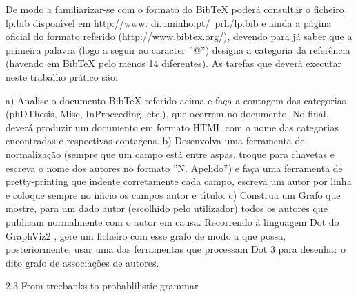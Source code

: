 De modo a familiarizar-se com o formato do BibTeX poderá consultar o ficheiro lp.bib disponı́vel em http://www.
di.uminho.pt/~prh/lp.bib e ainda a página oficial do formato referido (http://www.bibtex.org/), devendo para
já saber que a primeira palavra (logo a seguir ao caracter ”@”) designa a categoria da referência (havendo em BibTeX
pelo menos 14 diferentes).
As tarefas que deverá executar neste trabalho prático são:

a) Analise o documento BibTeX referido acima e faça a contagem das categorias (phDThesis, Misc, InProceeding,
    etc.), que ocorrem no documento. No final, deverá produzir um documento em formato HTML com o nome das
    categorias encontradas e respectivas contagens.
b) Desenvolva uma ferramenta de normalização (sempre que um campo está entre aspas, troque para chavetas e
    escreva o nome dos autores no formato ”N. Apelido”) e faça uma ferramenta de pretty-printing que indente
    corretamente cada campo, escreva um autor por linha e coloque sempre no inı́cio os campos autor e tı́tulo.
c) Construa um Grafo que mostre, para um dado autor (escolhido pelo utilizador) todos os autores que publicam
     normalmente com o autor em causa.
     Recorrendo à linguagem Dot do GraphViz2 , gere um ficheiro com esse grafo de modo a que possa, posteriormente,
     usar uma das ferramentas que processam Dot 3 para desenhar o dito grafo de associações de autores.

2.3    From treebanks to probablilistic grammar
